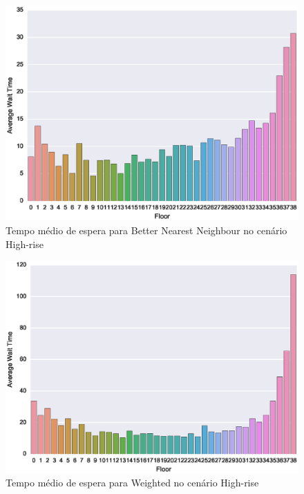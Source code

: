 \begin{figure}[htb!]
  \centering
  \includegraphics[scale=0.8]{img/results/High-rise/3_Simple_BetterNearestNeighbour/averageWaitTime}
  \caption{Tempo médio de espera para Better Nearest Neighbour no cenário High-rise}
  \label{fig:result:high-rise:avgwt:bnn}
\end{figure}

\begin{figure}[htb!]
  \centering
  \includegraphics[scale=0.8]{img/results/High-rise/4_Simple_Weighted/averageWaitTime}
  \caption{Tempo médio de espera para Weighted no cenário High-rise}
  \label{fig:result:high-rise:avgwt:weighted}
\end{figure}

